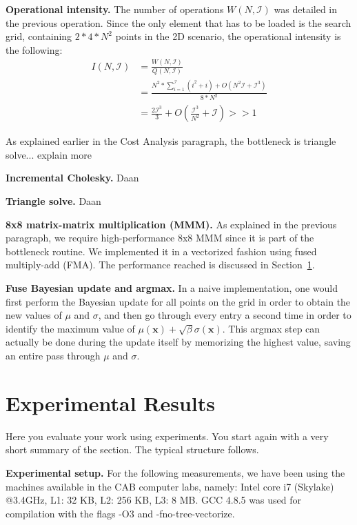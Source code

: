 \documentclass[letterpaper]{article}
\newcommand{\mypar}[1]{{\bf #1.}}
\begin{document}
\mypar{Operational intensity} The number of operations $W(N, \mathcal{I})$ was detailed in the previous operation. Since the only element that has to be loaded is the search grid, containing $2 * 4 * N^2$ points in the 2D scenario, the operational intensity is the following:
\begin{align*}
    I(N, \mathcal{I}) &= \frac{W(N, \mathcal{I})}{Q(N, \mathcal{I})} \\
    &= \frac{N^2*\sum_{i=1}^\mathcal{I}(i^2+i)+O(N^2\mathcal{I}+\mathcal{I}^3)}{8*N^2}\\
    &= \frac{2\mathcal{I}^3}{3}+O\left(\frac{\mathcal{I}^3}{N^2}+\mathcal{I}\right) >> 1
\end{align*}

As explained earlier in the Cost Analysis paragraph, the bottleneck is triangle solve... explain more

\mypar{Incremental Cholesky} Daan

\mypar{Triangle solve} Daan

\mypar{8x8 matrix-matrix multiplication (MMM)} As explained in the previous paragraph, we require high-performance 8x8 MMM since it is part of the bottleneck routine. We implemented it in a vectorized fashion using fused multiply-add (FMA). The performance reached is discussed in Section~\ref{sec:exp}.

\mypar{Fuse Bayesian update and argmax} In a naive implementation, one would first perform the Bayesian update for all points on the grid in order to obtain the new values of $\mu$ and $\sigma$, and then go through every entry a second time in order to identify the maximum value of $\mu(\mathbf{x})+\sqrt{\beta}\sigma(\mathbf{x})$. This argmax step can actually be done during the update itself by memorizing the highest value, saving an entire pass through $\mu$ and $\sigma$.

\section{Experimental Results}\label{sec:exp}

Here you evaluate your work using experiments. You start again with a
very short summary of the section. The typical structure follows.

\mypar{Experimental setup} For the following measurements, we have been using the machines available in the CAB computer labs, namely: Intel core i7 (Skylake) @3.4GHz, L1: 32 KB, L2: 256 KB, L3: 8 MB. GCC 4.8.5 was used for compilation with the flags -O3 and -fno-tree-vectorize.
\end{document}
